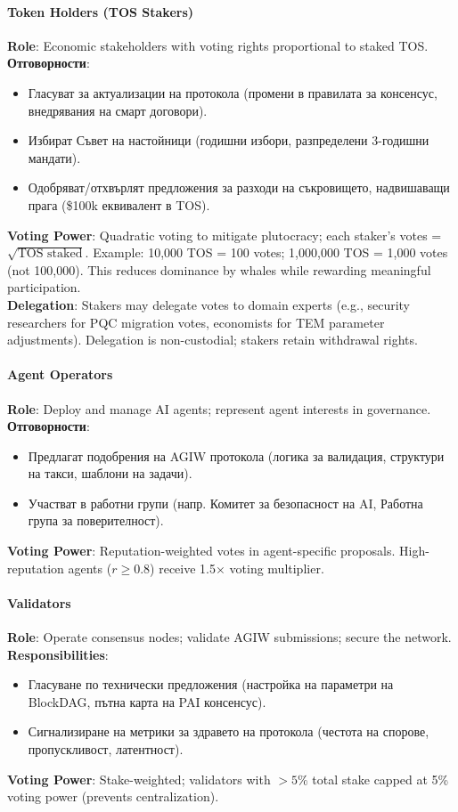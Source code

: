 \documentclass[11pt]{article}
\begin{document}
\paragraph{Token Holders (TOS Stakers)}
\textbf{Role}: Economic stakeholders with voting rights proportional to staked TOS.\\
\textbf{Отговорности}:
\begin{itemize}[noitemsep]
  \item Гласуват за актуализации на протокола (промени в правилата за консенсус, внедрявания на смарт договори).
  \item Избират Съвет на настойници (годишни избори, разпределени 3-годишни мандати).
  \item Одобряват/отхвърлят предложения за разходи на съкровището, надвишаващи прага (\$100k еквивалент в TOS).
\end{itemize}
\textbf{Voting Power}: Quadratic voting to mitigate plutocracy; each staker's votes = $\sqrt{\text{TOS staked}}$. Example: 10,000 TOS = 100 votes; 1,000,000 TOS = 1,000 votes (not 100,000). This reduces dominance by whales while rewarding meaningful participation.\\
\textbf{Delegation}: Stakers may delegate votes to domain experts (e.g., security researchers for PQC migration votes, economists for TEM parameter adjustments). Delegation is non-custodial; stakers retain withdrawal rights.

\paragraph{Agent Operators}
\textbf{Role}: Deploy and manage AI agents; represent agent interests in governance.\\
\textbf{Отговорности}:
\begin{itemize}[noitemsep]
  \item Предлагат подобрения на AGIW протокола (логика за валидация, структури на такси, шаблони на задачи).
  \item Участват в работни групи (напр. Комитет за безопасност на AI, Работна група за поверителност).
\end{itemize}
\textbf{Voting Power}: Reputation-weighted votes in agent-specific proposals. High-reputation agents ($r \geq 0.8$) receive 1.5$\times$ voting multiplier.

\paragraph{Validators}
\textbf{Role}: Operate consensus nodes; validate AGIW submissions; secure the network.\\
\textbf{Responsibilities}:
\begin{itemize}[noitemsep]
  \item Гласуване по технически предложения (настройка на параметри на BlockDAG, пътна карта на PAI консенсус).
  \item Сигнализиране на метрики за здравето на протокола (честота на спорове, пропускливост, латентност).
\end{itemize}
\textbf{Voting Power}: Stake-weighted; validators with $>5\%$ total stake capped at 5\% voting power (prevents centralization).
\end{document}
